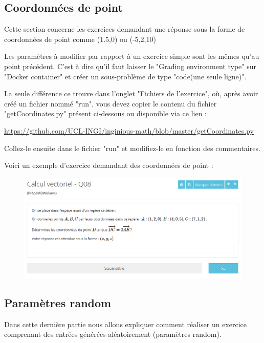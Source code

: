 \documentclass{article}
\begin{document}
\newpage
\subsection{Coordonnées de point} \label{coord}

Cette section concerne les exercices demandant une réponse sous la forme de coordonnées de point comme (1.5,0) ou  (-5,2,10)
\bigskip

Les paramètres à modifier par rapport à un exercice simple sont les mêmes qu'au point précédent. C'est à dire qu'il faut laisser le "Grading environment type" sur "Docker container" et créer un sous-problème de type "code(une seule ligne)". 

La seule différence ce trouve dans l'onglet "Fichiers de l'exercice", où, après avoir créé un fichier nommé "run", vous devez copier le contenu du fichier "getCoordinates.py" présent ci-dessous ou disponible via ce lien : 

\bigskip
\url{https://github.com/UCL-INGI/inginious-math/blob/master/getCoordinates.py}
\bigskip

Collez-le ensuite dans le fichier "run" et modifiez-le en fonction des commentaires.



\bigskip

Voici un exemple d'exercice demandant des coordonnées de point :

\begin{figure}[!htb]
    \centering
    \includegraphics[scale=0.6]{images/coord.png}
\end{figure}

\newpage
\subsection{Paramètres random}\label{random}

Dans cette dernière partie nous allons expliquer comment réaliser un exercice comprenant des entrées générées aléatoirement (paramètres random). 
\bigskip
\end{document}
